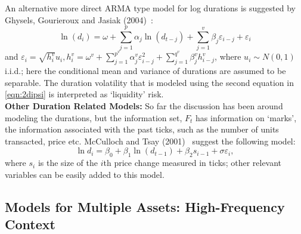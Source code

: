 An alternative more direct ARMA type model for log durations is suggested by Ghysels, Gourieroux and Jasiak (2004)~\cite{jasiak}:
        \begin{equation} \label{eqn:21lnd}
        	\ln{(d_i)} = \omega + \sum_{j=1}^p \alpha_j \ln{(d_{t-j})} + \sum_{j=1}^v \beta_j \varepsilon_{i-j} + \varepsilon_i
        \end{equation}
and $\varepsilon_i = \sqrt{h_i^v} u_i, h_i^v = \omega^v + \sum_{j=1}^{p^v} \alpha_j^v \varepsilon_{i-j}^2 + \sum_{j=1}^{q^v} \beta_j^v h_{i-j}^v$, where $u_i \sim N(0,1)$ i.i.d.; here the conditional mean and variance of durations are assumed to be separable. The duration volatility that is modeled using the second equation in \eqref{eqn:2dipsi} is interpreted as `liquidity' risk. \\


\noindent \textbf{Other Duration Related Models:} So far the discussion has been around modeling the durations, but the information set, $F_t$ has information on `marks', the information associated with the past ticks, such as the number of units transacted, price etc. McCulloch and Tsay (2001)~\cite{mccullochtsay07} suggest the following model:
	\begin{equation} \label{eqn:2lndi}
	\ln{d_i} = \beta_0 + \beta_1 \ln{(d_{t-1})} + \beta_2s_{i-1} + \sigma\varepsilon_i,
	\end{equation}
where $s_i$ is the size of the $i$th price change measured in ticks; other relevant variables can be easily added to this model.



\subsection{Models for Multiple Assets: High-Frequency Context}


